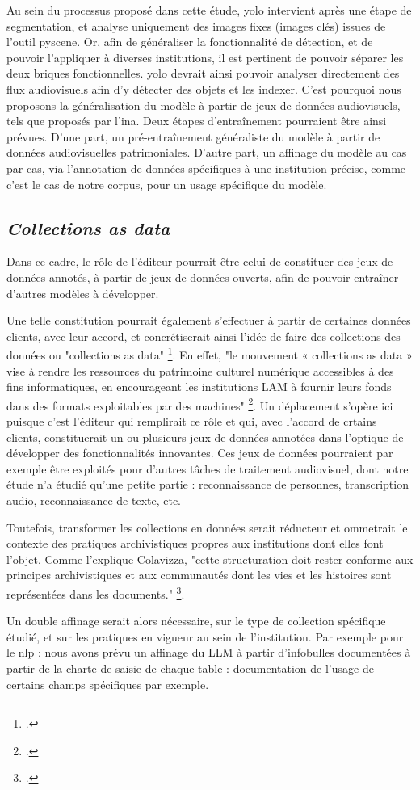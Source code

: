 Au sein du processus proposé dans cette étude, \gls{yolo} intervient après une étape de segmentation, et analyse uniquement des images fixes (images clés) issues de l'outil \gls{pyscene}. Or, afin de généraliser la fonctionnalité de détection, et de pouvoir l'appliquer à diverses institutions, il est pertinent de pouvoir séparer les deux briques fonctionnelles. \gls{yolo} devrait ainsi pouvoir analyser directement des flux audiovisuels afin d'y détecter des objets et les indexer. C'est pourquoi nous proposons la généralisation du modèle à partir de jeux de données audiovisuels, tels que proposés par l'\gls{ina}. Deux étapes d'entraînement pourraient être ainsi prévues. D'une part, un pré-entraînement généraliste du modèle à partir de données audiovisuelles patrimoniales. D'autre part, un affinage du modèle au cas par cas, via l'annotation de données spécifiques à une institution précise, comme c'est le cas de notre corpus, pour un usage spécifique du modèle.

\subsection{\textit{Collections as data}}

Dans ce cadre, le rôle de l'éditeur pourrait être celui de constituer des jeux de données annotés, à partir de jeux de données ouverts, afin de pouvoir entraîner d'autres modèles à développer. 

Une telle constitution pourrait également s'effectuer à partir de certaines données clients, avec leur accord, et concrétiserait ainsi l'idée de faire des collections des données ou "collections as data" \footcite{colavizza2026}. En effet, "le mouvement « collections as data » vise à rendre les ressources du patrimoine culturel numérique accessibles à des fins informatiques, en encourageant les institutions LAM à fournir leurs fonds dans des formats exploitables par des machines" \footcite{colavizza2026}. Un déplacement s'opère ici puisque c'est l'éditeur qui remplirait ce rôle et qui, avec l'accord de crtains clients, constituerait un ou plusieurs jeux de données annotées dans l'optique de développer des fonctionnalités innovantes. Ces jeux de données pourraient par exemple être exploités pour d'autres tâches de traitement audiovisuel, dont notre étude n'a étudié qu'une petite partie : reconnaissance de personnes, transcription audio, reconnaissance de texte, etc. 

Toutefois, transformer les collections en données serait réducteur et ommetrait le contexte des pratiques archivistiques propres aux institutions dont elles font l'objet. Comme l'explique Colavizza, "cette structuration doit rester conforme aux principes archivistiques et aux communautés dont les vies et les histoires sont représentées dans les documents." \footcite{colavizza2026}.

Un double affinage serait alors nécessaire, sur le type de collection spécifique étudié, et sur les pratiques en vigueur au sein de l'institution. Par exemple pour le \gls{nlp} : nous avons prévu un affinage du LLM à partir d'infobulles documentées à partir de la charte de saisie de chaque table : documentation de l'usage de certains champs spécifiques par exemple.  

